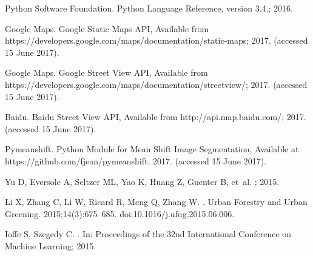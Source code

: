 {Python Software Foundation}. {Python Language Reference, version 3.4.}; 2016.

{Google Maps}. {Google Static Maps API, Available from
  https://developers.google.com/maps/documentation/static-maps}; 2017.
\newblock (accessed 15 June 2017).

{Google Maps}. {Google Street View API, Available from
  https://developers.google.com/maps/documentation/streetview/}; 2017.
\newblock (accessed 15 June 2017).

Baidu. {Baidu Street View API, Available from http://api.map.baidu.com/}; 2017.
\newblock (accessed 15 June 2017).

Pymeanshift. {Python Module for Mean Shift Image Segmentation, Available at
  https://github.com/fjean/pymeanshift}; 2017.
\newblock (accessed 15 June 2017).

Yu D, Eversole A, Seltzer ML, Yao K, Huang Z, Guenter B, et~al.
; 2015.

Li X, Zhang C, Li W, Ricard R, Meng Q, Zhang W.
.
\newblock Urban Forestry and Urban Greening. 2015;14(3):675--685.
\newblock doi:{10.1016/j.ufug.2015.06.006}.

Ioffe S, Szegedy C.
.
\newblock In: Proceedings of the 32nd International Conference on Machine
  Learning; 2015.

